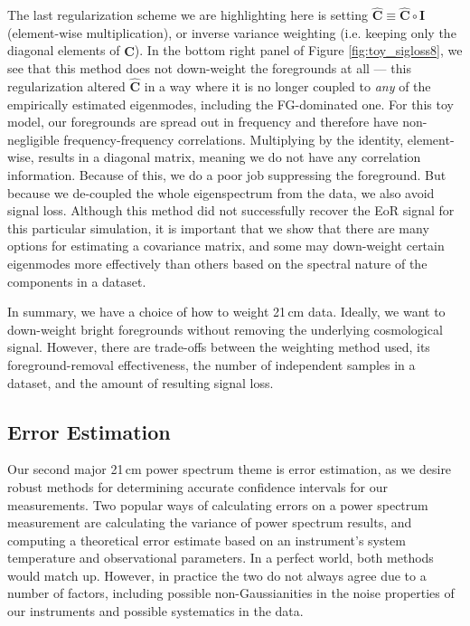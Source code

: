 \documentclass[preprint2,numberedappendix,tighten]{aastex6}  %
\begin{document}
The last regularization scheme we are highlighting here is setting $\widehat{\textbf{C}} \equiv \widehat{\textbf{C}} \circ \textbf{I}$ (element-wise multiplication), or inverse variance weighting (i.e. keeping only the diagonal elements of $\widehat{\textbf{C}}$). In the bottom right 
panel of Figure \ref{fig:toy_sigloss8}, we see that this method does not down-weight the foregrounds at all --- this regularization altered $\widehat{\textbf{C}}$ in a way where it is no longer coupled to \textit{any} of the empirically estimated eigenmodes, including the FG-dominated one. For this toy model, 
our foregrounds are spread out in frequency and therefore have non-negligible frequency-frequency correlations. Multiplying by 
the identity, element-wise, results in a diagonal matrix, meaning we do not have any correlation information. Because of this, we do a poor job 
suppressing the foreground. But because we de-coupled the whole eigenspectrum from the data, we also avoid signal loss. Although this method did not successfully recover the EoR signal for this particular simulation, it is important that we show that there 
are many options for estimating a covariance matrix, and some may down-weight certain eigenmodes more effectively than others based on the spectral nature 
of the components in a dataset. 

In summary, we have a choice of how to weight 21\,cm data. Ideally, we want to down-weight bright foregrounds without 
removing the underlying cosmological signal. However, there are trade-offs between the weighting method 
used, its foreground-removal effectiveness, the number of independent samples in a dataset, and the amount of resulting signal loss. 

\color{black}


\subsection{Error Estimation}
\label{sec:ErrorOverview}

Our second major 21\,cm power spectrum theme is error estimation, as we desire robust methods for determining accurate 
confidence intervals for our measurements. Two popular ways of calculating errors on a power spectrum 
measurement are calculating the variance of power spectrum results, and computing a theoretical error estimate based on an instrument's 
system temperature and observational parameters. In a perfect world, both methods would match up. However, in practice the 
two do not always agree due to a number of factors, including possible non-Gaussianities in the noise properties of our instruments and possible systematics in the data.
\end{document}
